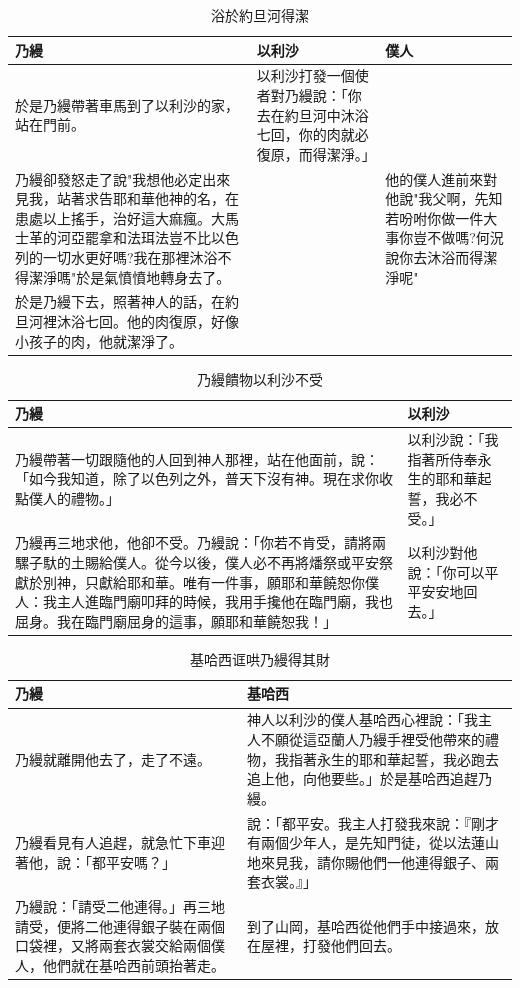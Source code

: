 \begin{table}[H]
\centering
\begin{tabular}{p{8.5cm}|p{}|p{4.0cm}}\hline\hline
乃縵&以利沙&僕人\\\hline
於是乃縵帶著車馬到了以利沙的家，站在門前。
&以利沙打發一個使者對乃縵說：「你去在約旦河中沐浴七回，你的肉就必復原，而得潔淨。」&\\\hline
乃縵卻發怒走了說"我想他必定出來見我，站著求告耶和華他神的名，在患處以上搖手，治好這大痲瘋。大馬士革的河亞罷拿和法珥法豈不比以色列的一切水更好嗎?我在那裡沐浴不得潔淨嗎"於是氣憤憤地轉身去了。&&他的僕人進前來對他說"我父啊，先知若吩咐你做一件大事你豈不做嗎?何況說你去沐浴而得潔淨呢"\\\hline
於是乃縵下去，照著神人的話，在約旦河裡沐浴七回。他的肉復原，好像小孩子的肉，他就潔淨了。&&\\\hline
\end{tabular}
\caption{浴於約旦河得潔}
\end{table}


\begin{table}[H]
\centering
\begin{tabular}{p{}|p{}}\hline\hline
乃縵&以利沙\\\hline
乃縵帶著一切跟隨他的人回到神人那裡，站在他面前，說：「如今我知道，除了以色列之外，普天下沒有神。現在求你收點僕人的禮物。」
&以利沙說：「我指著所侍奉永生的耶和華起誓，我必不受。」\\\hline
乃縵再三地求他，他卻不受。乃縵說：「你若不肯受，請將兩騾子馱的土賜給僕人。從今以後，僕人必不再將燔祭或平安祭獻於別神，只獻給耶和華。唯有一件事，願耶和華饒恕你僕人：我主人進臨門廟叩拜的時候，我用手攙他在臨門廟，我也屈身。我在臨門廟屈身的這事，願耶和華饒恕我！」&以利沙對他說：「你可以平平安安地回去。」\\\hline
\end{tabular}
\caption{乃縵饋物以利沙不受}
\end{table}


\begin{table}[H]
\centering
\begin{tabular}{p{}|p{10.5cm}}\hline\hline
乃縵&基哈西\\\hline
乃縵就離開他去了，走了不遠。&神人以利沙的僕人基哈西心裡說：「我主人不願從這亞蘭人乃縵手裡受他帶來的禮物，我指著永生的耶和華起誓，我必跑去追上他，向他要些。」於是基哈西追趕乃縵。\\\hline
乃縵看見有人追趕，就急忙下車迎著他，說：「都平安嗎？」&說：「都平安。我主人打發我來說：『剛才有兩個少年人，是先知門徒，從以法蓮山地來見我，請你賜他們一他連得銀子、兩套衣裳。』」\\\hline
乃縵說：「請受二他連得。」再三地請受，便將二他連得銀子裝在兩個口袋裡，又將兩套衣裳交給兩個僕人，他們就在基哈西前頭抬著走。&到了山岡，基哈西從他們手中接過來，放在屋裡，打發他們回去。\\\hline
\end{tabular}
\caption{基哈西诓哄乃縵得其財}
\end{table}



